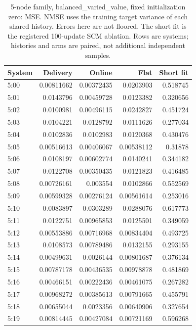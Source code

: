 \begin{table}[ht]
\centering\scriptsize
\begin{tabular}{lrrrr}
\toprule
System & Delivery & Online & Flat & Short fit\\
\midrule
5:00 & 0.00811662 & 0.00372435 & 0.0203903 & 0.518745\\
5:01 & 0.0143796 & 0.00459728 & 0.0123382 & 0.320656\\
5:02 & 0.0100981 & 0.00496115 & 0.0242827 & 0.451724\\
5:03 & 0.0104221 & 0.0128792 & 0.0111626 & 0.277034\\
5:04 & 0.0102836 & 0.0102983 & 0.0120368 & 0.430476\\
5:05 & 0.00516613 & 0.00406067 & 0.00538112 & 0.31878\\
5:06 & 0.0108197 & 0.00602774 & 0.0140241 & 0.344182\\
5:07 & 0.0122708 & 0.00350435 & 0.0121823 & 0.416485\\
5:08 & 0.00726161 & 0.003554 & 0.0102866 & 0.552569\\
5:09 & 0.00599328 & 0.00276124 & 0.00561614 & 0.253016\\
5:10 & 0.0083897 & 0.0303289 & 0.0288076 & 0.617773\\
5:11 & 0.0122751 & 0.00965853 & 0.0125501 & 0.349059\\
5:12 & 0.00553886 & 0.00716968 & 0.00834404 & 0.493725\\
5:13 & 0.0108573 & 0.00789486 & 0.0132155 & 0.293155\\
5:14 & 0.00499631 & 0.0026144 & 0.00801687 & 0.376134\\
5:15 & 0.00787178 & 0.00436535 & 0.00978878 & 0.481869\\
5:16 & 0.00466151 & 0.00222436 & 0.00461075 & 0.267282\\
5:17 & 0.00968272 & 0.00385613 & 0.00791665 & 0.455791\\
5:18 & 0.00655044 & 0.0023356 & 0.00640906 & 0.327654\\
5:19 & 0.00814445 & 0.00427084 & 0.00721169 & 0.596268\\
\bottomrule
\end{tabular}
\caption{5-node family, balanced\_varied\_value, fixed initialization zero: MSE. NMSE uses the training target variance of each shared history. Errors here are not floored. The short fit is the registered 100-update SCM ablation. Rows are systems; histories and arms are paired, not additional independent samples.}
\end{table}
